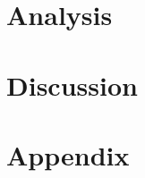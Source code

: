 \documentclass[danish ,a4paper,12pt]{article}
\begin{document}
\section{Analysis} \label{sec: analysis}

\pagebreak

\section{Discussion} \label{sec:discussion}


\pagebreak

 \renewcommand{\bibsection}{\section{Bibliography}}


\pagebreak
{}
\appendix
{}


\section{Appendix} \label{sec:appendix}

\pagebreak
\end{document}
